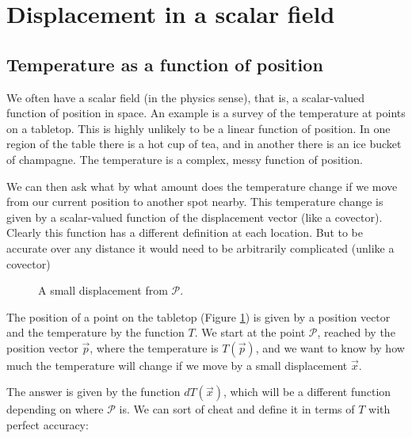 \section{Displacement in a scalar field}

\subsection{Temperature as a function of position}

We often have a scalar field (in the physics sense), that is, a scalar-valued function of position in space. An example is a survey of the temperature at points on a tabletop. This is highly unlikely to be a linear function of position. In one region of the table there is a hot cup of tea, and in another there is an ice bucket of champagne. The temperature is a complex, messy function of position.

We can then ask what by what amount does the temperature change if we move from our current position to another spot nearby. This temperature change is given by a scalar-valued function of the displacement vector (like a covector). Clearly this function has a different definition at each location. But to be accurate over any distance it would need to be arbitrarily complicated (unlike a covector)

\begin{figure}[h]
    \centering
    \caption{A small displacement from $\mathcal{P}$.} \label{fig:vector-displacement}
\end{figure}

The position of a point on the tabletop (Figure \ref{fig:vector-displacement}) is given by a position vector and the temperature by the function $T$. We start at the point $\mathcal{P}$, reached by the position vector $\vec{p}$, where the temperature is $T(\vec{p})$, and we want to know by how much the temperature will change if we move by a small displacement $\vec{x}$.

The answer is given by the function $dT(\vec{x})$, which will be a different function depending on where $\mathcal{P}$ is. We can sort of cheat and define it in terms of $T$ with perfect accuracy:

